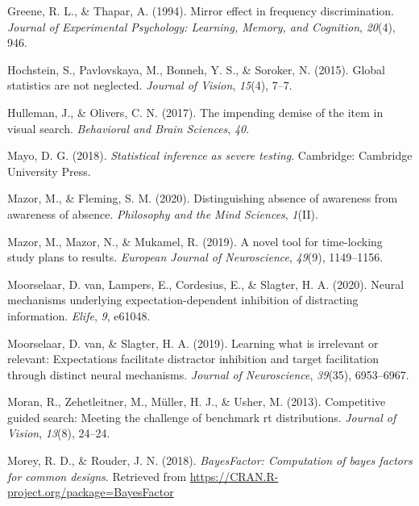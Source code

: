 \documentclass[
  english,
  man]{apa6}
\begin{document}
\leavevmode\hypertarget{ref-greene1994mirror}{}%
Greene, R. L., \& Thapar, A. (1994). Mirror effect in frequency discrimination. \emph{Journal of Experimental Psychology: Learning, Memory, and Cognition}, \emph{20}(4), 946.

\leavevmode\hypertarget{ref-hochstein2015global}{}%
Hochstein, S., Pavlovskaya, M., Bonneh, Y. S., \& Soroker, N. (2015). Global statistics are not neglected. \emph{Journal of Vision}, \emph{15}(4), 7--7.

\leavevmode\hypertarget{ref-hulleman2017impending}{}%
Hulleman, J., \& Olivers, C. N. (2017). The impending demise of the item in visual search. \emph{Behavioral and Brain Sciences}, \emph{40}.

\leavevmode\hypertarget{ref-mayo2018statistical}{}%
Mayo, D. G. (2018). \emph{Statistical inference as severe testing}. Cambridge: Cambridge University Press.

\leavevmode\hypertarget{ref-mazor2020distinguishing}{}%
Mazor, M., \& Fleming, S. M. (2020). Distinguishing absence of awareness from awareness of absence. \emph{Philosophy and the Mind Sciences}, \emph{1}(II).

\leavevmode\hypertarget{ref-mazor2019novel}{}%
Mazor, M., Mazor, N., \& Mukamel, R. (2019). A novel tool for time-locking study plans to results. \emph{European Journal of Neuroscience}, \emph{49}(9), 1149--1156.

\leavevmode\hypertarget{ref-van2020neural}{}%
Moorselaar, D. van, Lampers, E., Cordesius, E., \& Slagter, H. A. (2020). Neural mechanisms underlying expectation-dependent inhibition of distracting information. \emph{Elife}, \emph{9}, e61048.

\leavevmode\hypertarget{ref-van2019learning}{}%
Moorselaar, D. van, \& Slagter, H. A. (2019). Learning what is irrelevant or relevant: Expectations facilitate distractor inhibition and target facilitation through distinct neural mechanisms. \emph{Journal of Neuroscience}, \emph{39}(35), 6953--6967.

\leavevmode\hypertarget{ref-moran2013competitive}{}%
Moran, R., Zehetleitner, M., Müller, H. J., \& Usher, M. (2013). Competitive guided search: Meeting the challenge of benchmark rt distributions. \emph{Journal of Vision}, \emph{13}(8), 24--24.

\leavevmode\hypertarget{ref-R-BayesFactor}{}%
Morey, R. D., \& Rouder, J. N. (2018). \emph{BayesFactor: Computation of bayes factors for common designs}. Retrieved from \url{https://CRAN.R-project.org/package=BayesFactor}
\end{document}
